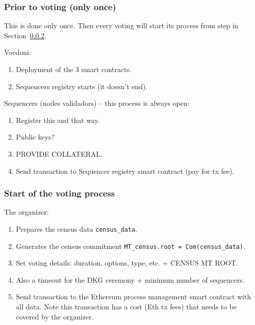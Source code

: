 \subsubsection{Prior to voting (only once)}
\label{sec:vocdoni-protocol:prior-steps}


This is done only once. Then every voting will start its process from step in Section~\ref{sec:vocdoni-protocol:start}.

Vocdoni:
\begin{enumerate}
	\item Deployment of the 3 smart contracts.
	\item Sequencers registry starts (it doesn't end).
\end{enumerate}

Sequencers (nodes validadors) -- this process is always open:
\begin{enumerate}
	\item Register this and that way.
	\item Public keys?
	\item PROVIDE COLLATERAL.
	\item Send transaction to Sequencer registry smart contract (pay for tx fee).
\end{enumerate}

\subsubsection{Start of the voting process}
\label{sec:vocdoni-protocol:start}

The organizer:
\begin{enumerate}
	\item Prepares the census data \texttt{census\_data}.
	\item Generates the census commitment \texttt{MT\_census.root = Com(census\_data)}.
	\item Set voting details: duration, options, type, etc. + CENSUS MT ROOT.
	\item Also a timeout for the DKG ceremony + minimum number of sequencers.
	\item Send transaction to the Ethereum process management smart contract with all data. Note this transaction has a cost (Eth tx fees) that needs to be covered by the organizer.
\end{enumerate}

